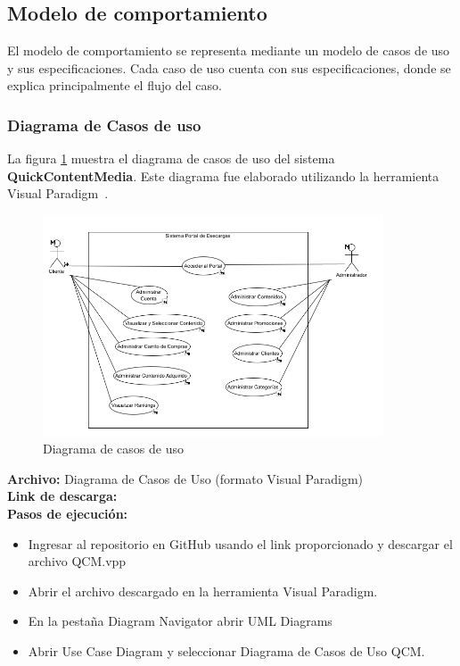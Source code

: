 \subsection{Modelo de comportamiento}

El modelo de comportamiento se representa mediante un modelo de casos de uso y sus especificaciones.
Cada caso de uso cuenta con sus especificaciones, donde se explica principalmente el flujo del caso.

\subsubsection{Diagrama de Casos de uso}
La figura \ref{fig:DiaramaCasoDeUso} muestra el diagrama de casos de uso del sistema \textbf{QuickContentMedia}.
Este diagrama fue elaborado utilizando la herramienta Visual Paradigm~\cite{staruml2024}.

\begin{figure}[H]
    \centering
    \includegraphics[width=0.9\textwidth]{Media/3_Analisis/3_ModeloDeRequisitos/CasosDeUso.png}
    \caption{Diagrama de casos de uso} 
    \label{fig:DiaramaCasoDeUso}
\end{figure}

\textbf{Archivo:} Diagrama de Casos de Uso (formato Visual Paradigm) \\
\textbf{Link de descarga:} \linkDiagramaCasoDeUso \\

\textbf{Pasos de ejecución:}
\begin{itemize}
    \item Ingresar al repositorio en GitHub usando el link proporcionado y descargar el archivo QCM.vpp
    \item Abrir el archivo descargado en la herramienta Visual Paradigm.
    \item En la pestaña Diagram Navigator abrir UML Diagrams
    \item Abrir Use Case Diagram y seleccionar Diagrama de Casos de Uso QCM.

\end{itemize}

